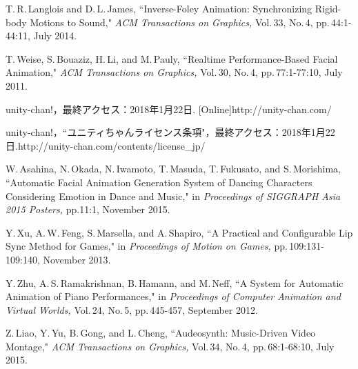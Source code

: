 \begin{thebibliography}{55}
T.\,R.\,Langlois and D.\,L.\,James,
 ``Inverse-Foley Animation: Synchronizing Rigid-body Motions to Sound,"
 \textit{ACM Transactions on Graphics,} Vol.\,33, No.\,4, pp.\,44:1-44:11, July 2014.

T.\,Weise, S.\,Bouaziz, H.\,Li, and M.\,Pauly,
 ``Realtime Performance-Based Facial Animation,"
 \textit{ACM Transactions on Graphics,} Vol.\,30, No.\,4, pp.\,77:1-77:10, July 2011.

unity-chan!，最終アクセス：2018年1月22日.
[Online]http://unity-chan.com/

unity-chan!，``ユニティちゃんライセンス条項"，最終アクセス：2018年1月22日.\newline
[Online]http://unity-chan.com/contents/license\_jp/

W.\,Asahina, N.\,Okada, N.\,Iwamoto, T.\,Masuda, T.\,Fukusato, and S.\,Morishima,
 ``Automatic Facial Animation Generation System of Dancing Characters Considering Emotion in Dance and Music,"
 in \textit{Proceedings of SIGGRAPH Asia 2015 Posters,} pp.11:1, November 2015.

Y.\,Xu, A.\,W.\,Feng, S.\,Marsella, and A.\,Shapiro,
 ``A Practical and Configurable Lip Sync Method for Games,"
 in \textit{Proceedings of Motion on Games,} pp.\,109:131-109:140, November 2013.

Y.\,Zhu, A.\,S.\,Ramakrishnan, B.\,Hamann, and M.\,Neff,
 ``A System for Automatic Animation of Piano Performances,"
  in \textit{Proceedings of Computer Animation and Virtual Worlds,} Vol.\,24, No.\,5, pp.\,445-457, September 2012.

Z.\,Liao, Y.\,Yu, B.\,Gong, and L.\,Cheng,
 ``Audeosynth: Music-Driven Video Montage,"
 \textit{ACM Transactions on Graphics,} Vol.\,34, No.\,4, pp.\,68:1-68:10, July 2015.

\end{thebibliography}